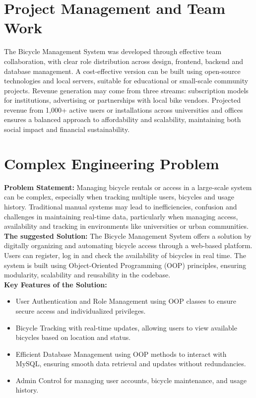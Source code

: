 
\section{Project Management and Team Work}
The Bicycle Management System was developed through effective team collaboration, with clear role distribution across design, frontend, backend and database management. A cost-effective version can be built using open-source technologies and local servers, suitable for educational or small-scale community projects. Revenue generation may come from three streams: subscription models for institutions, advertising or partnerships with local bike vendors. Projected revenue from 1,000+ active users or installations across universities and offices ensures a balanced approach to affordability and scalability, maintaining both social impact and financial sustainability.\cite{4.2}

\section{Complex Engineering Problem}
\textbf{Problem Statement:} Managing bicycle rentals or access in a large-scale system can be complex, especially when tracking multiple users, bicycles and usage history. Traditional manual systems may lead to inefficiencies, confusion and challenges in maintaining real-time data, particularly when managing access, availability and tracking in environments like universities or urban communities.\\
\textbf{The suggested Solution:}
The Bicycle Management System offers a solution by digitally organizing and automating bicycle access through a web-based platform. Users can register, log in and check the availability of bicycles in real time. The system is built using Object-Oriented Programming (OOP) principles, ensuring modularity, scalability and reusability in the codebase.\\
\textbf{Key Features of the Solution:}
\begin{itemize}
\item User Authentication and Role Management using OOP classes to ensure secure access and individualized privileges.
\item Bicycle Tracking with real-time updates, allowing users to view available bicycles based on location and status.
\item Efficient Database Management using OOP methods to interact with MySQL, ensuring smooth data retrieval and updates without redundancies.
\item Admin Control for managing user accounts, bicycle maintenance, and usage history.\cite{4.3}
\end{itemize}

